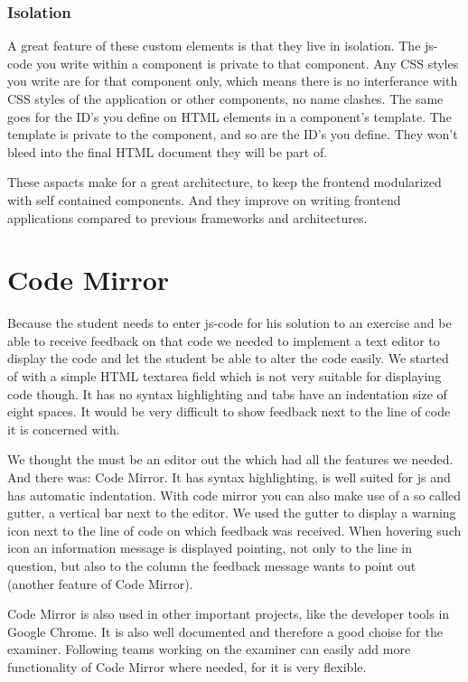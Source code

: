 \subsubsection{Isolation}
A great feature of these custom elements is that they live in isolation.
The \gls{js-code} you write within a component is private to that component.
Any CSS styles you write are for that component only,
which means there is no interferance with CSS styles of the application
or other components, no name clashes.
The same goes for the ID's you define
on HTML elements in a component's template.
The template is private to the component, and so are the ID's you define.
They won't bleed into the final HTML document they will be part of.

These aspacts make for a great architecture,
to keep the frontend modularized with self contained components.
And they improve on writing frontend applications
compared to previous frameworks and architectures.

\section{Code Mirror}
Because the \gls{student} needs to enter \gls{js-code}
for his solution to an exercise
and be able to receive feedback on that code
we needed to implement a text editor to display the code
and let the \gls{student} be able to alter the code easily.
We started of with a simple HTML textarea field
which is not very suitable for displaying code though.
It has no syntax highlighting
and tabs have an indentation size of eight spaces.
It would be very difficult to show feedback
next to the line of code it is concerned with.

We thought the must be an editor out the which had all the features we needed.
And there was: Code Mirror.
It has syntax highlighting,
is well suited for \gls{js}
and has automatic indentation.
With code mirror you can also make use of a so called gutter,
a vertical bar next to the editor.
We used the gutter to display a warning icon next to the line of code
on which feedback was received.
When hovering such icon an information message is displayed
pointing, not only to the line in question,
but also to the column the feedback message wants to point out
(another feature of Code Mirror).

Code Mirror is also used in other important projects,
like the developer tools in Google Chrome.
It is also well documented and therefore a good choise for the \gls{examiner}.
Following teams working on the \gls{examiner}
can easily add more functionality of Code Mirror where needed,
for it is very flexible.
